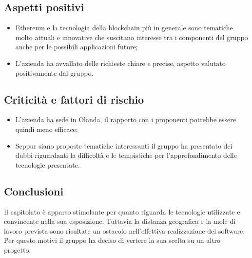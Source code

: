 \subsection{Aspetti positivi}
\begin{itemize}
    \item Ethereum e la tecnologia della blockchain più in generale sono tematiche molto attuali e innovative che suscitano interesse tra i componenti del gruppo
    anche per le possibili applicazioni future;
    \item L'azienda ha avvallato delle richieste chiare e precise, aspetto valutato positivamente dal gruppo.
\end{itemize}
\subsection{Criticità e fattori di rischio}
\begin{itemize}
    \item L'azienda ha sede in Olanda, il rapporto con i proponenti potrebbe essere quindi meno efficace;
    \item Seppur siano proposte tematiche interessanti il gruppo ha presentato dei dubbi riguardanti la difficoltà e le tempistiche per l'approfondimento
    delle tecnologie presentate.
\end{itemize}
\subsection{Conclusioni}
Il capitolato è apparso stimolante per quanto riguarda le tecnologie utilizzate e convincente nella sua esposizione. Tuttavia la distanza geografica e la
mole di lavoro prevista sono risultate un ostacolo nell'effettiva realizzazione del software. Per questo motivi il gruppo ha deciso di vertere la sua scelta
su un altro progetto.
